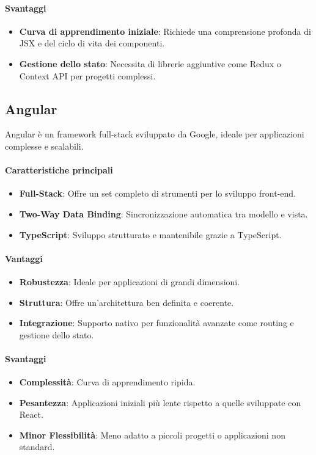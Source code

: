 \documentclass{article}
\begin{document}
\paragraph*{Svantaggi}
\begin{itemize}
    \item \textbf{Curva di apprendimento iniziale}: Richiede una comprensione profonda di JSX e del ciclo di vita dei componenti.
    \item \textbf{Gestione dello stato}: Necessita di librerie aggiuntive come Redux o Context API per progetti complessi.
\end{itemize}

\subsection{Angular}
Angular \`e un framework full-stack sviluppato da Google, ideale per applicazioni complesse e scalabili.

\paragraph*{Caratteristiche principali}
\begin{itemize}
    \item \textbf{Full-Stack}: Offre un set completo di strumenti per lo sviluppo front-end.
    \item \textbf{Two-Way Data Binding}: Sincronizzazione automatica tra modello e vista.
    \item \textbf{TypeScript}: Sviluppo strutturato e mantenibile grazie a TypeScript.
\end{itemize}

\paragraph*{Vantaggi}
\begin{itemize}
    \item \textbf{Robustezza}: Ideale per applicazioni di grandi dimensioni.
    \item \textbf{Struttura}: Offre un'architettura ben definita e coerente.
    \item \textbf{Integrazione}: Supporto nativo per funzionalit\`a avanzate come routing e gestione dello stato.
\end{itemize}

\paragraph*{Svantaggi}
\begin{itemize}
    \item \textbf{Complessit\`a}: Curva di apprendimento ripida.
    \item \textbf{Pesantezza}: Applicazioni iniziali pi\`u lente rispetto a quelle sviluppate con React.
    \item \textbf{Minor Flessibilit\`a}: Meno adatto a piccoli progetti o applicazioni non standard.
\end{itemize}
\end{document}
